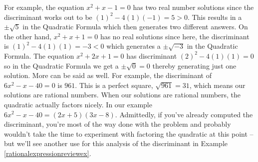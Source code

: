 \documentclass{ximera}
\begin{document}
For example, the equation $x^2 + x - 1 = 0$ has two real number solutions since the discriminant works out to be $(1)^2 - 4(1)(-1) = 5 > 0$.  This results in a $\pm \sqrt{5}$ in the Quadratic Formula which then generates two different answers.  On the other hand, $x^2 + x + 1 = 0$ has no real solutions since here, the discriminant is $(1)^2 - 4(1)(1) = -3 < 0$ which generates a $\pm \sqrt{-3}$ in the Quadratic Formula.  The equation $x^2 + 2x +1 = 0$ has discriminant $(2)^2 - 4(1)(1) = 0$ so in the Quadratic Formula we get a $\pm \sqrt{0} = 0$ thereby  generating just one solution.  More can be said as well.  For example, the discriminant of $6x^2 - x - 40 = 0$ is $961$.  This is a perfect square, $\sqrt{961} = 31$, which means our solutions are rational numbers.  When our solutions are rational numbers, the quadratic actually factors nicely. In our example  $6x^2 - x - 40 = (2x+5)(3x-8)$.  Admittedly,  if you've already computed the discriminant, you're most of the way done with the problem and probably wouldn't take the time to experiment with factoring the quadratic at this point -- but we'll see another use for this analysis of the discriminant in Example \ref{rationalexpressionreviewex}.



\closegraphsfile
\end{document}
